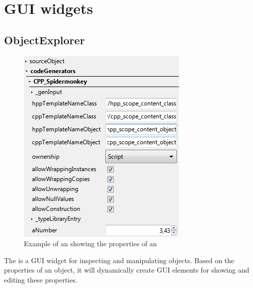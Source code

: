 \section{GUI widgets}

\subsection{ObjectExplorer}
\label{sec:ObjectExplorer}

\begin{figure}
  \vspace{-20pt}
  \begin{center}
    \includegraphics[scale=0.60]{Images/ObjectExplorer.png}
  \end{center}
  \caption{Example of an  showing the properties of an }
  \label{fig:ObjectExplorer}
  \vspace{-15pt}
\end{figure}

The  is a GUI widget for inspecting and manipulating  objects. Based on the properties of an object, it will dynamically create GUI elements for showing and editing these properties.

